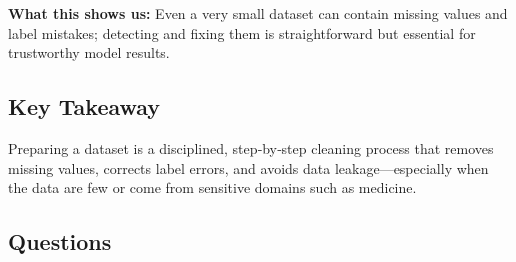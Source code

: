 \documentclass[12pt, a4paper]{article}
\begin{document}
\textbf{What this shows us:}  
Even a very small dataset can contain missing values and label mistakes; detecting and fixing them is straightforward but essential for trustworthy model results.  

\subsection{Key Takeaway}
Preparing a dataset is a disciplined, step‑by‑step cleaning process that removes missing values, corrects label errors, and avoids data leakage—especially when the data are few or come from sensitive domains such as medicine.

\subsection*{Questions}
\end{document}
